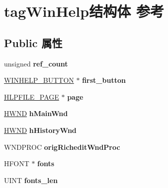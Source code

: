 \hypertarget{structtag_win_help}{}\section{tag\+Win\+Help结构体 参考}
\label{structtag_win_help}
\subsection*{Public 属性}
\begin{DoxyCompactItemize}
\item 
\mbox{\label{structtag_win_help_afa07c1d9de89d6c073c2d6e4ce1f43f1}} 
unsigned {\bfseries ref\+\_\+count}
\item 
\mbox{\label{structtag_win_help_aca136f2615e3324db2826b7739ed0f72}} 
\hyperlink{structtag_help_button}{W\+I\+N\+H\+E\+L\+P\+\_\+\+B\+U\+T\+T\+ON} $\ast$ {\bfseries first\+\_\+button}
\item 
\mbox{\label{structtag_win_help_a5872ee5ccf09f9e60fb706d20b308586}} 
\hyperlink{structtag_hlp_file_page}{H\+L\+P\+F\+I\+L\+E\+\_\+\+P\+A\+GE} $\ast$ {\bfseries page}
\item 
\mbox{\label{structtag_win_help_a31c877ecbec3694311153e4a01ceca19}} 
\hyperlink{interfacevoid}{H\+W\+ND} {\bfseries h\+Main\+Wnd}
\item 
\mbox{\label{structtag_win_help_a92a1b8fdf6322b44a4f8b29b75b4e32d}} 
\hyperlink{interfacevoid}{H\+W\+ND} {\bfseries h\+History\+Wnd}
\item 
\mbox{\label{structtag_win_help_a1ed1ad96070b5055935c59688bf9ee21}} 
W\+N\+D\+P\+R\+OC {\bfseries orig\+Richedit\+Wnd\+Proc}
\item 
\mbox{\label{structtag_win_help_ac823fc6649646e0edad1c7a6ee8e7bc8}} 
H\+F\+O\+NT $\ast$ {\bfseries fonts}
\item 
\mbox{\label{structtag_win_help_ad1a490ebbfdedba242331a52afe90d40}} 
U\+I\+NT {\bfseries fonts\+\_\+len}
\item 
\mbox{\label{structtag_win_help_af62a2a882e7845feb891f856b857ccc1}} 

\end{DoxyCompactItemize}
